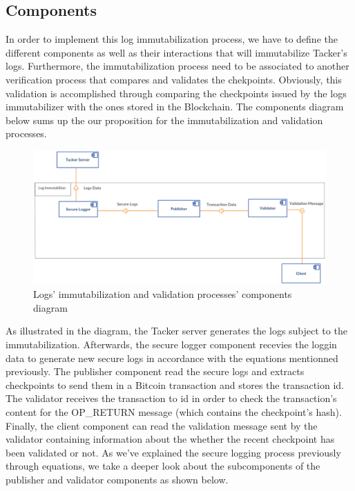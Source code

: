 \subsection{Components}
In order to implement this log immutabilization process, we have to define the different components as well as their interactions that will immutabilize Tacker's logs. Furthermore, the immutabilization process need to be associated to another verification process that compares and validates the chekpoints. Obviously, this validation is accomplished through comparing the checkpoints issued by the logs immutabilizer with the ones stored in the Blockchain. The components diagram below sums up the our proposition for the immutabilization and validation processes.
\begin{figure}[htp]
    \centering
    \includegraphics[scale=0.25]{comps}
    \caption{Logs' immutabilization and validation processes' components diagram}
\end{figure}
As illustrated in the diagram, the Tacker server generates the logs subject to the immutabilization. Afterwards, the secure logger component recevies the loggin data to generate new secure logs in accordance with the equations mentionned previously. The publisher component read the secure logs and extracts checkpoints to send them in a Bitcoin transaction and stores the transaction id. The validator receives the transaction to id in order to check the transaction's content for the OP\_RETURN message (which contains the checkpoint's hash). Finally, the client component can read the validation message sent by the validator containing information about the whether the recent checkpoint  has been validated or not. As we've explained the secure logging process previously through equations, we take a deeper look about the subcomponents of the publisher and validator components as shown below.
